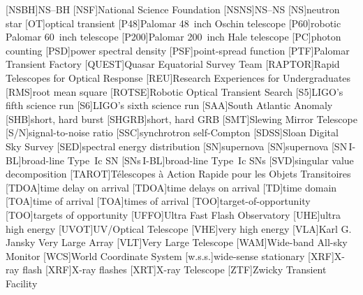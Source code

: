 \begin{acronym}
[NSBH]{\acl{NS}\nobreakdashes--\acl{BH}}
[NSF]{National Science Foundation}
[NSNS]{\acl{NS}\nobreakdashes--\acl{NS}}
[NS]{neutron star}
[OT]{optical transient}
[P48]{Palomar 48~inch Oschin telescope}
[P60]{robotic Palomar 60~inch telescope}
[P200]{Palomar 200~inch Hale telescope}
[PC]{photon counting}
[PSD]{power spectral density}
[PSF]{point-spread function}
[PTF]{Palomar Transient Factory}
[QUEST]{Quasar Equatorial Survey Team}
[RAPTOR]{Rapid Telescopes for Optical Response}
[REU]{Research Experiences for Undergraduates}
[RMS]{root mean square}
[ROTSE]{Robotic Optical Transient Search}
[S5]{\ac{LIGO}'s fifth science run}
[S6]{\ac{LIGO}'s sixth science run}
[SAA]{South Atlantic Anomaly}
[SHB]{short, hard burst}
[SHGRB]{short, hard \acl{GRB}}
[SMT]{Slewing Mirror Telescope}
[S/N]{signal\nobreakdashes-to\nobreakdashes-noise ratio}
[SSC]{synchrotron self\nobreakdashes-Compton}
[SDSS]{Sloan Digital Sky Survey}
[SED]{spectral energy distribution}
[SN]{supernova}
[SN]{supernova}
[\acs{SN}\,I\nobreakdashes-BL]{broad\nobreakdashes-line Type~Ic \ac{SN}}
[\acsp{SN}\,I\nobreakdashes-BL]{broad\nobreakdashes-line Type~Ic \acp{SN}}
[SVD]{singular value decomposition}
[TAROT]{T\'{e}lescopes \`{a} Action Rapide pour les Objets Transitoires}
[TDOA]{time delay on arrival}
[TDOA]{time delays on arrival}
[TD]{time domain}
[TOA]{time of arrival}
[TOA]{times of arrival}
[TOO]{target\nobreakdashes-of\nobreakdashes-opportunity}
[TOO]{targets of opportunity}
[UFFO]{Ultra Fast Flash Observatory}
[UHE]{ultra high energy}
[UVOT]{UV/Optical Telescope}
[VHE]{very high energy}
[VLA]{Karl G. Jansky Very Large Array}
[VLT]{Very Large Telescope}
[WAM]{Wide\nobreakdashes-band All\nobreakdashes-sky Monitor}
[WCS]{World Coordinate System}
[w.s.s.]{wide\nobreakdashes-sense stationary}
[XRF]{X\nobreakdashes-ray flash}
[XRF]{X\nobreakdashes-ray flashes}
[XRT]{X\nobreakdashes-ray Telescope}
[ZTF]{Zwicky Transient Facility}
\end{acronym}
